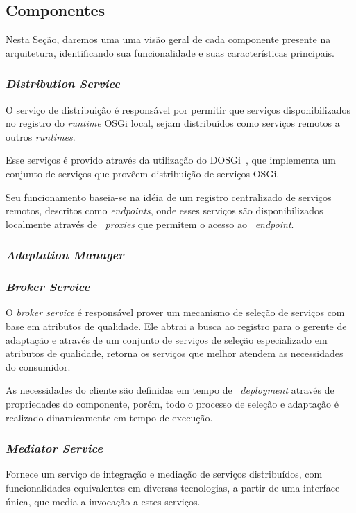 \subsection{Componentes}
Nesta Seção, daremos uma uma visão geral de cada componente presente na arquitetura, identificando sua funcionalidade e suas características principais.

\subsubsection{\textit{Distribution Service}}
O serviço de distribuição é responsável por permitir que serviços disponibilizados no registro do \textit{runtime} OSGi local, sejam distribuídos como serviços remotos a outros \textit{runtimes}.

Esse serviços é provido através da utilização do DOSGi~\cite{dosgi}, que implementa um conjunto de serviços que provêem distribuição de serviços OSGi. 

Seu funcionamento baseia-se na idéia de um registro centralizado de serviços remotos, descritos como \textit{endpoints}, onde esses serviços são disponibilizados localmente através de ~\textit{proxies} que permitem o acesso ao ~\textit{endpoint}.

\subsubsection{\textit{Adaptation Manager}}

\subsubsection{\textit{Broker Service}}
O \textit{broker service} é responsável prover um mecanismo de seleção de serviços com base em atributos de qualidade. Ele abtrai a busca ao registro para o gerente de adaptação e através de um conjunto de serviços de seleção especializado em atributos de qualidade, retorna os serviços que melhor atendem as necessidades do consumidor.

As necessidades do cliente são definidas em tempo de ~\textit{deployment} através de propriedades do componente, porém, todo o processo de seleção e adaptação é realizado dinamicamente em tempo de execução. 


\subsubsection{\textit{Mediator Service}}
Fornece um serviço de integração e mediação de serviços distribuídos, com funcionalidades equivalentes em diversas tecnologias, a partir de uma interface única, que media a invocação a estes serviços. 

